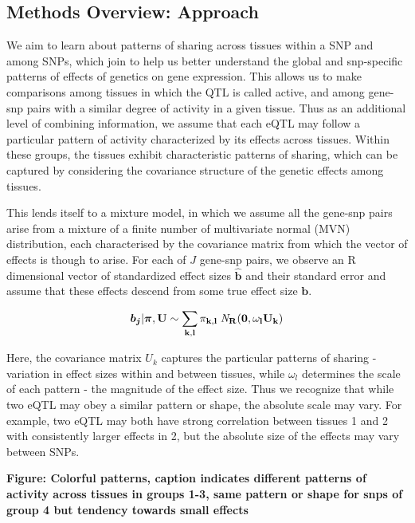 \subsection{Methods Overview: Approach} 

We aim to learn about patterns of sharing across tissues within a SNP and among SNPs, which join to help us better understand the global and snp-specific patterns of effects of genetics on gene expression. 
This allows us to make comparisons among tissues in which the QTL is called active, and among gene-snp pairs with a similar degree of activity in a given tissue. 
Thus as an additional level of combining information, we assume that each eQTL may follow a particular pattern of activity characterized by its effects across tissues. Within these groups, the tissues exhibit characteristic patterns of sharing, which can be captured by considering the covariance structure of the genetic effects among tissues. 

This lends itself to a mixture model, in which  we assume all the gene-snp pairs arise from a mixture of a finite number of multivariate normal (MVN) distribution, each characterised by the covariance matrix from which the vector of effects is though to arise. For each of $J$ gene-snp pairs, we observe an R dimensional vector of standardized effect sizes $\bm\hat{b}$ and their standard error and assume that these effects descend from some true effect size $\bm{b}$. 



 \begin{equation}
  \bm{b_{j}} | \bm{\pi},\bf{U} \sim \sum_{k,l} \pi_{k,l} \;{\it N}_R(\bm{0}, \omega_l U_{k})
\end{equation}

Here, the covariance matrix $U_{k}$ captures the particular patterns of sharing - variation in effect sizes within and between tissues, while $\omega_{l}$ determines the scale of each pattern - the magnitude of the effect size. Thus we recognize that while two eQTL may obey a similar pattern or shape, the absolute scale may vary. For example, two eQTL may both have strong correlation between tissues 1 and 2 with consistently larger effects in 2, but the absolute size of the effects may vary between SNPs.\newline

\textbf{Figure: Colorful patterns, caption indicates different patterns of activity across tissues in groups 1-3, same pattern or shape for snps of group 4 but tendency towards small effects}

